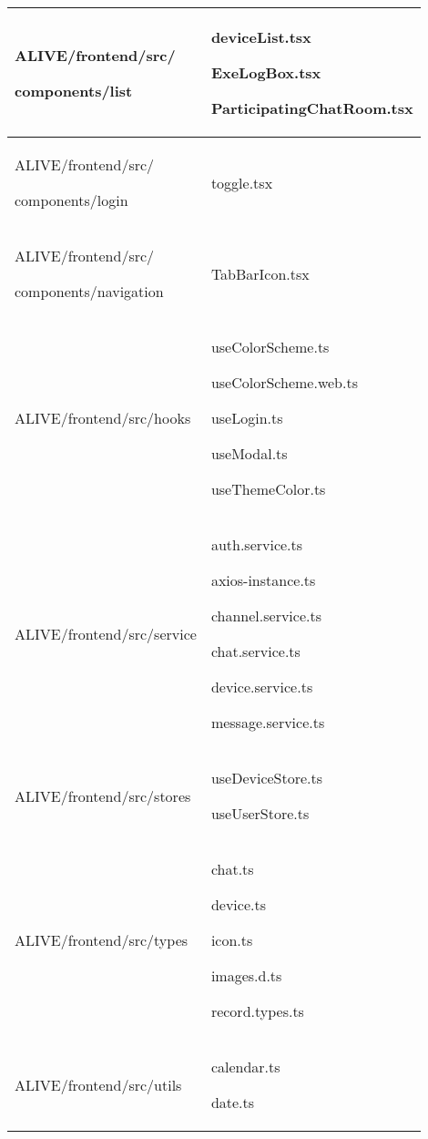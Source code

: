 \documentclass[conference]{IEEEtran}
\begin{document}
\begin{table}[h]
\begin{tabular}{|p{3.7cm}|p{4.1cm}|}
          ALIVE/frontend/src/ \par components/list \par  & deviceList.tsx \par ExeLogBox.tsx \par ParticipatingChatRoom.tsx
          \\ \hline
          
          ALIVE/frontend/src/ \par components/login \par  & toggle.tsx
          \\ \hline
          
          ALIVE/frontend/src/ \par components/navigation \par  & TabBarIcon.tsx
          \\ \hline
          
          ALIVE/frontend/src/hooks \par  & useColorScheme.ts \par useColorScheme.web.ts \par useLogin.ts \par useModal.ts \par useThemeColor.ts
          \\ \hline
          
          ALIVE/frontend/src/service \par  & auth.service.ts \par axios-instance.ts \par channel.service.ts \par chat.service.ts \par device.service.ts \par message.service.ts
          \\ \hline
          
          ALIVE/frontend/src/stores \par  &   useDeviceStore.ts \par useUserStore.ts
          \\ \hline
          
          ALIVE/frontend/src/types \par  & chat.ts \par device.ts \par icon.ts \par images.d.ts \par record.types.ts 
          \\ \hline
          
          ALIVE/frontend/src/utils \par  & calendar.ts \par date.ts
          \\ \hline
    \end{tabular}
\end{table}
\end{document}
